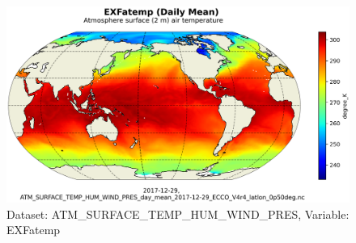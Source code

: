 \begin{figure}[H]
\centering
\includegraphics[scale=0.55]{../images/plots/latlon_plots/Atmosphere_Surface_Temperature_Humidity_Wind_and_Pressure/EXFatemp.png}
\caption{Dataset: ATM\_SURFACE\_TEMP\_HUM\_WIND\_PRES, Variable: EXFatemp}
\label{tab:table-ATM_SURFACE_TEMP_HUM_WIND_PRES_EXFatemp-Plot}
\end{figure}
\pagebreak
